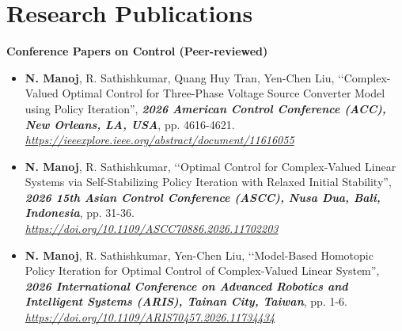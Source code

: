 \documentclass[A4,11pt]{article}
\begin{document}
\section{\textbf{\huge Research Publications}}
 \textbf{Conference Papers on Control (Peer-reviewed)}
\begin{itemize}
\item[2026] {\bf N. Manoj}, R. Sathishkumar, Quang Huy Tran, Yen-Chen Liu, \lq\lq Complex-Valued Optimal Control for Three-Phase Voltage Source Converter Model using Policy Iteration'', \textbf{\textit{2026 American Control Conference (ACC), New Orleans, LA, USA}}, pp. 4616-4621.\\ \textit{\url{https://ieeexplore.ieee.org/abstract/document/11616055}}
\item[2026] {\bf N. Manoj}, R. Sathishkumar, \lq\lq Optimal Control for Complex-Valued Linear Systems via Self-Stabilizing Policy Iteration with Relaxed Initial Stability'', \textbf{\textit{2026 15th Asian Control Conference (ASCC), Nusa Dua, Bali, Indonesia}}, pp. 31-36.\\ \textit{\url{https://doi.org/10.1109/ASCC70886.2026.11702203}}
\item[2026] {\bf N. Manoj}, R. Sathishkumar, Yen-Chen Liu, \lq\lq Model-Based Homotopic Policy Iteration for Optimal Control of Complex-Valued Linear System'', \textbf{\textit{2026 International Conference on Advanced Robotics and Intelligent Systems (ARIS), Tainan City, Taiwan}}, pp. 1-6.\\ \textit{\url{https://doi.org/10.1109/ARIS70457.2026.11734434}}
\end{itemize}
\end{document}
